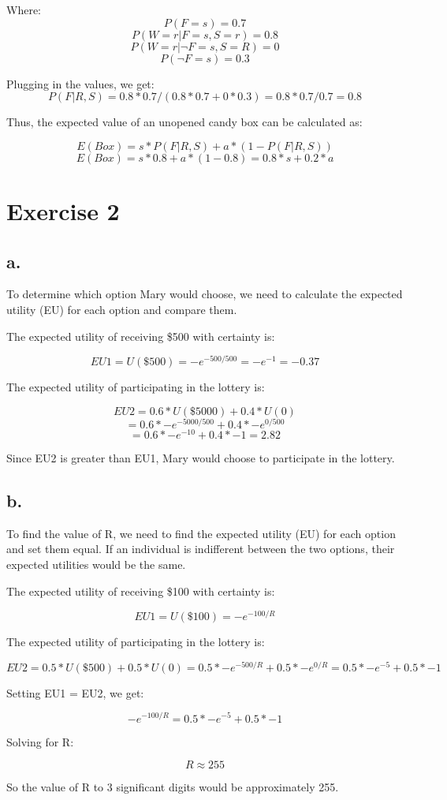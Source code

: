 \documentclass{article}
\begin{document}
Where:
\[P(F = s) = 0.7\]
\[P(W = r|F = s, S = r) = 0.8\]
\[P(W = r|\neg F = s, S = R) = 0\]
\[P(\neg F = s) = 0.3\]

Plugging in the values, we get:
\[P(F|R,S) = 0.8 * 0.7 / (0.8 * 0.7 + 0 * 0.3) = 0.8 * 0.7 / 0.7 = 0.8\]

Thus, the expected value of an unopened candy box can be calculated as:

\[E(Box) = s * P(F|R,S) + a * (1 - P(F|R,S))\]
\[E(Box) = s * 0.8 + a * (1 - 0.8) = 0.8 * s + 0.2 * a\]

\section*{Exercise 2}

\subsection*{a.}

To determine which option Mary would choose, we need to calculate the expected utility (EU) for each option and compare them.

The expected utility of receiving \$500 with certainty is:

\[EU1 = U(\$500) = -e^{-500/500} = -e^{-1} = -0.37\]

The expected utility of participating in the lottery is:

\[EU2 = 0.6 * U(\$5000) + 0.4 * U(0)\]
\[= 0.6 * -e^{-5000/500} + 0.4 * -e^{0/500}\]
\[= 0.6 * -e^{-10} + 0.4 * -1 = 2.82\]

Since EU2 is greater than EU1, Mary would choose to participate in the lottery.

\subsection*{b.}

To find the value of R, we need to find the expected utility (EU) for each option and set them equal. If an individual is indifferent between the two options, their expected utilities would be the same.

The expected utility of receiving \$100 with certainty is:

\[EU1 = U(\$100) = -e^{-100/R}\]

The expected utility of participating in the lottery is:

\[EU2 = 0.5 * U(\$500) + 0.5 * U(0) = 0.5 * -e^{-500/R} + 0.5 * -e^{0/R} = 0.5 * -e^{-5} + 0.5 * -1\]

Setting EU1 = EU2, we get:

\[-e^{-100/R} = 0.5 * -e^{-5} + 0.5 * -1\]

Solving for R:

\[R \approx 255\]

So the value of R to 3 significant digits would be approximately 255.
\end{document}
